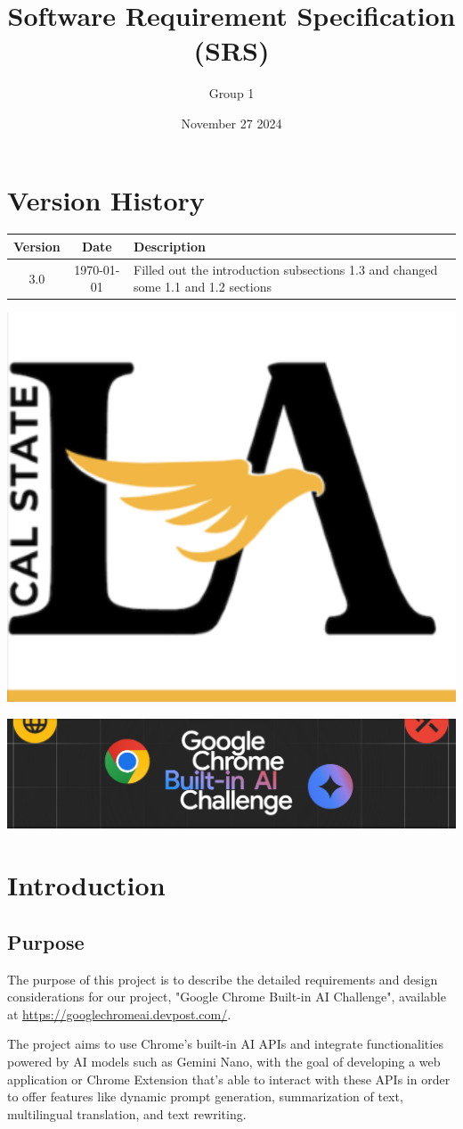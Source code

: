 \documentclass{article}
\title{Software Requirement Specification (SRS)}
\author{Group 1 }
\date{November 27 2024}
\begin{document}
\maketitle  
\pagebreak

\tableofcontents
\pagebreak

\section*{Version History}
\begin{longtable}{|c|c|p{10cm}|}
\hline
\textbf{Version} & \textbf{Date} & \textbf{Description} \\ \hline
3.0 & \today & Filled out the introduction subsections 1.3 and changed some 1.1 and 1.2 sections \\ \hline
\end{longtable}
\pagebreak

\includegraphics[width=0.3\linewidth]{../logo/csula.png} 

\includegraphics[width=0.3\linewidth]{../logo/chromeai.png} 

\section{Introduction}
\subsection{Purpose}
The purpose of this project is to describe the detailed requirements and design considerations for our project, "Google Chrome Built-in AI Challenge", available at \url{https://googlechromeai.devpost.com/}.

The project aims to use Chrome's built-in AI APIs and integrate functionalities powered by AI models such as Gemini Nano, with the goal of developing a web application or Chrome Extension that's able to interact with these APIs in order to offer features like dynamic prompt generation, summarization of text, multilingual translation, and text rewriting.
\end{document}
